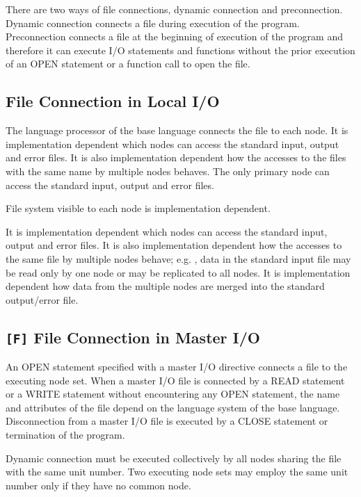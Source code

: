   There are two ways of file connections, dynamic connection and
  preconnection.
  Dynamic connection connects a file during execution of the program.
  Preconnection connects a file at the beginning of execution of the
  program and therefore it can execute I/O statements and functions
  without the prior execution of an OPEN statement or a function call to
  open the file.

  \subsection{File Connection in Local I/O}

  The language processor of the base language connects the file to each
  node.
  It is implementation dependent which nodes can access the standard
  input, output and error files.
  It is also implementation dependent how the accesses to the files with the same name by multiple nodes behaves.
  The only primary node can access the standard input, output and error files.
  
  File system visible to each node is implementation dependent.

  It is implementation dependent which nodes can access the standard
  input, output and error files.
  It is also implementation dependent how the accesses to the same file by multiple nodes behave; e.g.
  , data in the standard input file may
  be read only by one node or may be replicated to all nodes.
  It is implementation dependent how data from the multiple nodes are
  merged into the standard output/error file.
  \fi

  \subsection{{\tt [F]} File Connection in Master I/O}

  An OPEN statement specified with a master I/O directive connects a
  file to the executing node set.
  When a master I/O file is connected by a READ statement or a WRITE
  statement without encountering any OPEN statement, the name and
  attributes of the file depend on the language system of the base
  language.
  Disconnection from a master I/O file is executed by a CLOSE statement
  or termination of the program.

  Dynamic connection must be executed collectively by all nodes sharing
  the file with the same unit number.
  Two executing node sets may employ the same unit number only if they
  have no common node.

